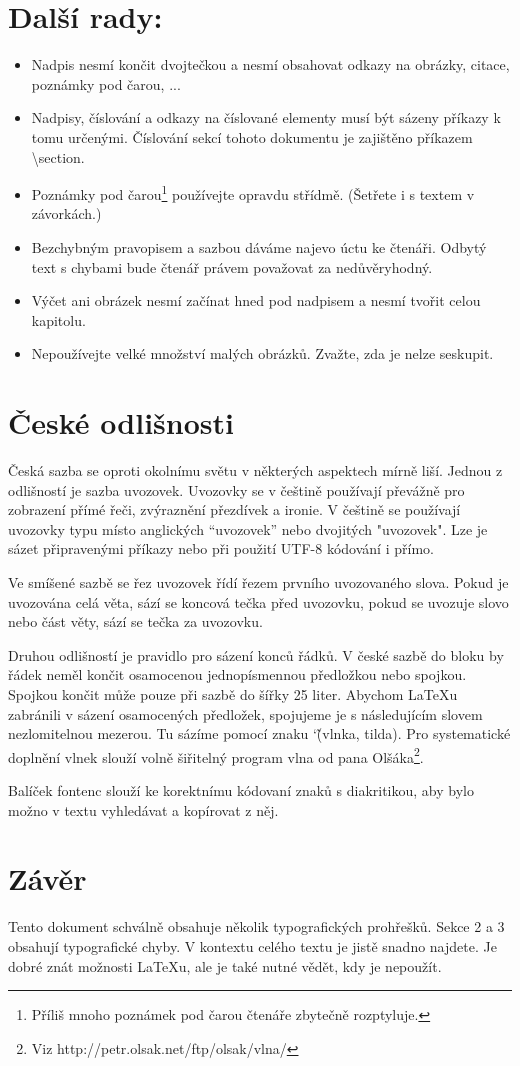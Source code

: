 \documentclass[twocolumn]{article}
\begin{document}
\section{Další rady:}
\begin{itemize}
    \item Nadpis nesmí končit dvojtečkou a nesmí obsahovat odkazy na obrázky, citace, poznámky pod čarou, ...
    \item Nadpisy, číslování a odkazy na číslované elementy musí být sázeny příkazy k tomu určenými.
    Číslování sekcí tohoto dokumentu je zajištěno příkazem \textbackslash section.
    
    \item Poznámky pod čarou\footnote{ Příliš mnoho poznámek pod čarou čtenáře zbytečně rozptyluje.} používejte opravdu střídmě.
    (Šetřete i s textem v závorkách.)   
    \item Bezchybným pravopisem a sazbou dáváme najevo úctu ke čtenáři.
    Odbytý text s chybami bude čtenář právem považovat za nedůvěryhodný.
    \item Výčet ani obrázek nesmí začínat hned pod nadpisem a nesmí tvořit celou kapitolu.
    \item Nepoužívejte velké množství malých obrázků.
    Zvažte, zda je nelze seskupit.
\end{itemize}
\section{České odlišnosti}
Česká sazba se oproti okolnímu světu v některých aspektech mírně liší.
Jednou z odlišností je sazba uvozovek.
Uvozovky se v češtině používají převážně pro zobrazení přímé řeči, zvýraznění přezdívek a ironie.
V češtině se používají uvozovky typu  místo anglických ``uvozovek'' nebo dvojitých "uvozovek".
Lze je sázet připravenými příkazy nebo při použití UTF-8 kódování i přímo.

Ve smíšené sazbě se řez uvozovek řídí řezem prvního uvozovaného slova.
Pokud je uvozována celá věta, sází se koncová tečka před uvozovku, pokud se uvozuje slovo nebo část věty, sází se tečka za uvozovku.

Druhou odlišností je pravidlo pro sázení konců řádků.
V české sazbě do bloku by řádek neměl končit osamocenou jednopísmennou předložkou nebo spojkou.
Spojkou  končit může pouze při sazbě do šířky 25 liter.
Abychom \LaTeX u zabránili v sázení osamocených předložek, spojujeme je s následujícím slovem nezlomitelnou mezerou.
Tu sázíme pomocí znaku \char`\~ (vlnka, tilda).
Pro systematické doplnění vlnek slouží volně šiřitelný program vlna od pana Olšáka\footnote {Viz http://petr.olsak.net/ftp/olsak/vlna/}.

Balíček fontenc slouží ke korektnímu kódovaní znaků s diakritikou, aby bylo možno v textu vyhledávat a kopírovat z něj.
\section{Závěr}
Tento dokument schválně obsahuje několik typografických prohřešků.
Sekce 2 a 3 obsahují typografické chyby.
V kontextu celého textu je jistě snadno najdete.
Je dobré znát možnosti \LaTeX u, ale je také nutné vědět, kdy je nepoužít.
\end{document}
